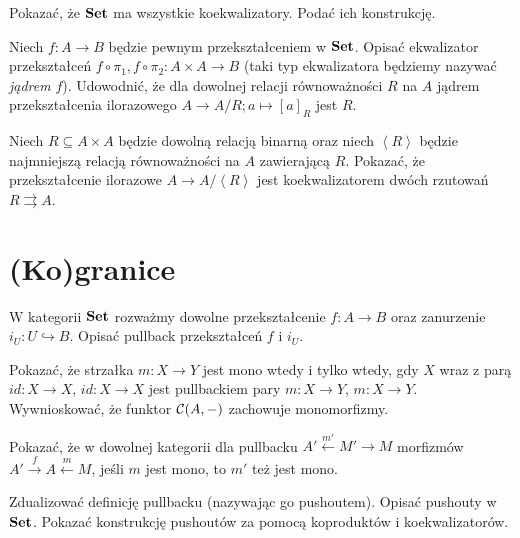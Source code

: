 \begin{zadanie}
Pokazać, że $\mathbf{Set}$ ma wszystkie koekwalizatory. Podać ich konstrukcję.
\end{zadanie}

\begin{zadanie}
Niech $f:A\to B$ będzie pewnym przekształceniem w $\mathbf{Set}$. Opisać ekwalizator przekształceń $f\circ \pi_1, f\circ \pi_2:A\times A\to B$ (taki typ ekwalizatora będziemy nazywać \emph{jądrem} $f$). Udowodnić, że dla dowolnej relacji równoważności $R$ na $A$ jądrem  przekształcenia ilorazowego $A\to A/R; a\mapsto [a]_R$ jest $R$.
\end{zadanie}

\begin{zadanie}
Niech $R\subseteq A\times A$ będzie dowolną relacją binarną oraz niech $\left < R\right >$ będzie najmniejszą relacją równoważności na $A$ zawierającą $R$. Pokazać, że przekształcenie ilorazowe $A\to A/\left < R \right >$ jest koekwalizatorem dwóch rzutowań $R\rightrightarrows A$. 
\end{zadanie}

\clearpage
\section{(Ko)granice}

\begin{zadanie}\label{zad:pullback-przeciwobraz}
W kategorii $\mathbf{Set}$ rozważmy dowolne przekształcenie $f\colon A\to B$ oraz zanurzenie $i_U\colon U\hookrightarrow B$. Opisać pullback przekształceń $f$ i $i_U$.
\end{zadanie}

\begin{zadanie}
Pokazać, że strzałka $m:X\to Y$ jest mono wtedy i tylko wtedy, gdy $X$ wraz z parą $id:X\to X$, $id:X\to X$ jest pullbackiem pary $m:X\to Y$, $m:X\to Y$. Wywnioskować, że funktor $\mathcal{C}(A,-)$ zachowuje monomorfizmy.
\end{zadanie}

\begin{zadanie}
Pokazać, że w dowolnej kategorii dla pullbacku  $A'\stackrel{m'}{\leftarrow} M'\rightarrow M$ morfizmów $A'\stackrel{f}{\rightarrow } A\stackrel{m}{\leftarrow }M$, jeśli $m$ jest mono, to $m'$ też jest mono. 
\end{zadanie}

\begin{zadanie}
Zdualizować definicję pullbacku (nazywając go pushoutem). Opisać pushouty w $\mathbf{Set}$. Pokazać konstrukcję pushoutów za pomocą koproduktów i koekwalizatorów. 
\end{zadanie}

